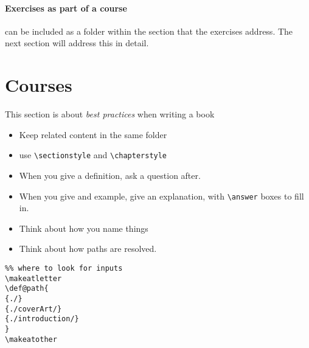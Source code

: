 \documentclass{ximera}
\begin{document}
\paragraph{Exercises as part of a course} can be included as a folder within
the section that the exercises address. The next section will address this in
detail.

    \section{Courses}

    This section is about \textit{best practices} when writing a book
    \begin{itemize}
      \item Keep related content in the same folder
      \item use \texttt{\textbackslash sectionstyle} and
            \texttt{\textbackslash chapterstyle}
      \item When you give a definition, ask a question after.
      \item When you give and example, give an explanation, with
            \texttt{\textbackslash answer} boxes to fill in.
      \item Think about how you name things
      \item Think about how paths are resolved.
    \end{itemize}

    \begin{verbatim}
%% where to look for inputs
\makeatletter
\def@path{
{./}
{./coverArt/}
{./introduction/}
}
\makeatother
\end{verbatim}
    \pdfOnly{\end{multicols}}
\end{document}
